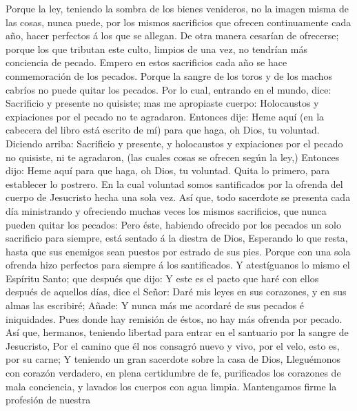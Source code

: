  Porque la ley, teniendo la sombra de los bienes
venideros, no la imagen misma de las cosas, nunca puede, por los mismos
sacrificios que ofrecen continuamente cada año, hacer perfectos á los
que se allegan.  De otra manera cesarían de ofrecerse;
porque los que tributan este culto, limpios de una vez, no tendrían más
conciencia de pecado.  Empero en estos sacrificios cada
año se hace conmemoración de los pecados.  Porque la
sangre de los toros y de los machos cabríos no puede quitar los pecados.
 Por lo cual, entrando en el mundo, dice: Sacrificio y
presente no quisiste; mas me apropiaste cuerpo: 
Holocaustos y expiaciones por el pecado no te agradaron. 
Entonces dije: Heme aquí (en la cabecera del libro está escrito de mí)
para que haga, oh Dios, tu voluntad.  Diciendo arriba:
Sacrificio y presente, y holocaustos y expiaciones por el pecado no
quisiste, ni te agradaron, (las cuales cosas se ofrecen según la ley,)
 Entonces dijo: Heme aquí para que haga, oh Dios, tu
voluntad. Quita lo primero, para establecer lo postrero. 
En la cual voluntad somos santificados por la ofrenda del cuerpo de
Jesucristo hecha una sola vez.  Así que, todo sacerdote
se presenta cada día ministrando y ofreciendo muchas veces los mismos
sacrificios, que nunca pueden quitar los pecados:  Pero
éste, habiendo ofrecido por los pecados un solo sacrificio para siempre,
está sentado á la diestra de Dios,  Esperando lo que
resta, hasta que sus enemigos sean puestos por estrado de sus pies.
 Porque con una sola ofrenda hizo perfectos para siempre
á los santificados.  Y atestíguanos lo mismo el Espíritu
Santo; que después que dijo:  Y este es el pacto que haré
con ellos después de aquellos días, dice el Señor: Daré mis leyes en sus
corazones, y en sus almas las escribiré;  Añade: Y nunca
más me acordaré de sus pecados é iniquidades.  Pues donde
hay remisión de éstos, no hay más ofrenda por pecado. 
Así que, hermanos, teniendo libertad para entrar en el santuario por la
sangre de Jesucristo,  Por el camino que él nos consagró
nuevo y vivo, por el velo, esto es, por su carne;  Y
teniendo un gran sacerdote sobre la casa de Dios, 
Lleguémonos con corazón verdadero, en plena certidumbre de fe,
purificados los corazones de mala conciencia, y lavados los cuerpos con
agua limpia.  Mantengamos firme la profesión de nuestra
